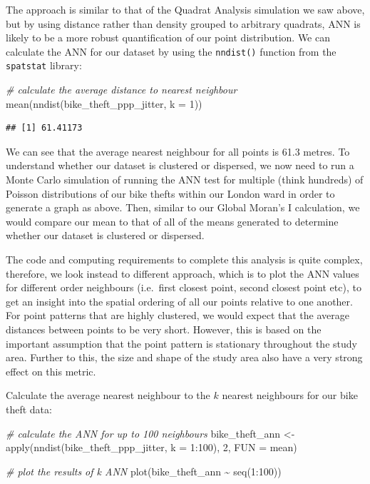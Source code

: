 \documentclass[
]{book}
\newenvironment{Shaded}{\begin{snugshade}}{\end{snugshade}}
\newcommand{\AttributeTok}[1]{\textcolor[rgb]{0.77,0.63,0.00}{#1}}
\newcommand{\CommentTok}[1]{\textcolor[rgb]{0.56,0.35,0.01}{\textit{#1}}}
\newcommand{\DecValTok}[1]{\textcolor[rgb]{0.00,0.00,0.81}{#1}}
\newcommand{\FunctionTok}[1]{\textcolor[rgb]{0.00,0.00,0.00}{#1}}
\newcommand{\NormalTok}[1]{#1}
\newcommand{\OtherTok}[1]{\textcolor[rgb]{0.56,0.35,0.01}{#1}}
\newcommand{\SpecialCharTok}[1]{\textcolor[rgb]{0.00,0.00,0.00}{#1}}
\begin{document}
The approach is similar to that of the Quadrat Analysis simulation we saw above, but by using distance rather than density grouped to arbitrary quadrats, ANN is likely to be a more robust quantification of our point distribution. We can calculate the ANN for our dataset by using the \texttt{nndist()} function from the \texttt{spatstat} library:

\begin{Shaded}
\begin{Highlighting}[]
\CommentTok{\# calculate the average distance to nearest neighbour}
\FunctionTok{mean}\NormalTok{(}\FunctionTok{nndist}\NormalTok{(bike\_theft\_ppp\_jitter, }\AttributeTok{k =} \DecValTok{1}\NormalTok{))}
\end{Highlighting}
\end{Shaded}

\begin{verbatim}
## [1] 61.41173
\end{verbatim}

We can see that the average nearest neighbour for all points is 61.3 metres. To understand whether our dataset is clustered or dispersed, we now need to run a Monte Carlo simulation of running the ANN test for multiple (think hundreds) of Poisson distributions of our bike thefts within our London ward in order to generate a graph as above. Then, similar to our Global Moran's I calculation, we would compare our mean to that of all of the means generated to determine whether our dataset is clustered or dispersed.

The code and computing requirements to complete this analysis is quite complex, therefore, we look instead to different approach, which is to plot the ANN values for different order neighbours (i.e.~first closest point, second closest point etc), to get an insight into the spatial ordering of all our points relative to one another. For point patterns that are highly clustered, we would expect that the average distances between points to be very short. However, this is based on the important assumption that the point pattern is stationary throughout the study area. Further to this, the size and shape of the study area also have a very strong effect on this metric.

Calculate the average nearest neighbour to the \(k\) nearest neighbours for our bike theft data:

\begin{Shaded}
\begin{Highlighting}[]
\CommentTok{\# calculate the ANN for up to 100 neighbours}
\NormalTok{bike\_theft\_ann }\OtherTok{\textless{}{-}} \FunctionTok{apply}\NormalTok{(}\FunctionTok{nndist}\NormalTok{(bike\_theft\_ppp\_jitter, }\AttributeTok{k =} \DecValTok{1}\SpecialCharTok{:}\DecValTok{100}\NormalTok{), }\DecValTok{2}\NormalTok{, }\AttributeTok{FUN =}\NormalTok{ mean)}

\CommentTok{\# plot the results of k ANN}
\FunctionTok{plot}\NormalTok{(bike\_theft\_ann }\SpecialCharTok{\textasciitilde{}} \FunctionTok{seq}\NormalTok{(}\DecValTok{1}\SpecialCharTok{:}\DecValTok{100}\NormalTok{))}
\end{Highlighting}
\end{Shaded}
\end{document}
